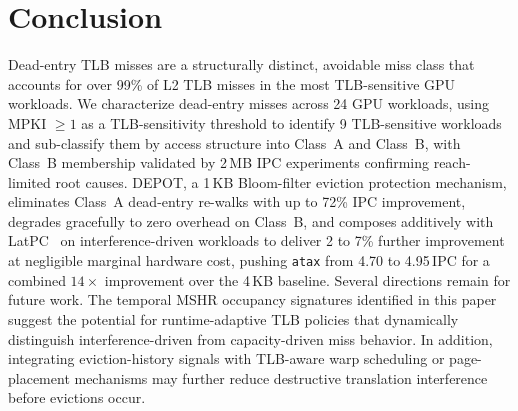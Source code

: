 \section{Conclusion}
\label{sec:conclusion}

Dead-entry TLB misses are a structurally distinct, avoidable miss class that accounts
for over 99\% of L2 TLB misses in the most TLB-sensitive GPU workloads.
We characterize dead-entry misses across 24 GPU workloads, using MPKI $\geq 1$ as a
TLB-sensitivity threshold to identify 9 TLB-sensitive workloads and sub-classify them
by access structure into Class~A and Class~B,
with Class~B membership validated by 2\,MB IPC experiments confirming reach-limited
root causes.
DEPOT, a 1\,KB Bloom-filter eviction protection mechanism, eliminates Class~A
dead-entry re-walks with up to 72\% IPC improvement, degrades gracefully to zero
overhead on Class~B, and composes additively with LatPC~\cite{latpc} on
interference-driven workloads to deliver 2 to 7\% further improvement at negligible
marginal hardware cost, pushing \texttt{atax} from 4.70 to 4.95\,IPC for a combined
$14\times$ improvement over the 4\,KB baseline.
Several directions remain for future work.
The temporal MSHR occupancy signatures identified in this paper suggest the potential
for runtime-adaptive TLB policies that dynamically distinguish interference-driven from
capacity-driven miss behavior.
In addition, integrating eviction-history signals with TLB-aware warp scheduling or
page-placement mechanisms may further reduce destructive translation interference
before evictions occur.

